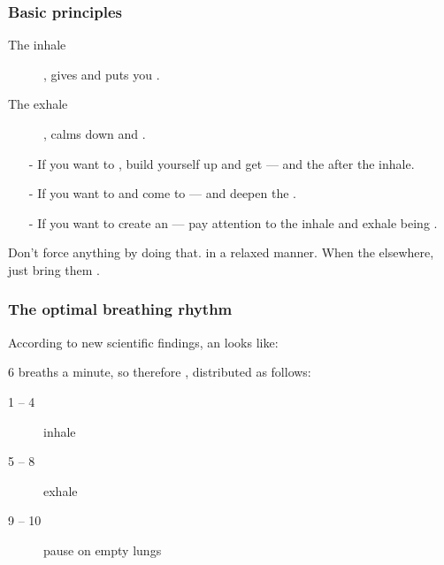 \begin{frame}
\frametitle{Basic principles}

\begin{description}
\item[The inhale] , gives  and puts you .
\item[The exhale] , calms down and .
  \end{description}

\begin{itemize}
\item[-] If you want to , build yourself up and get  ---  and the  after the inhale.
\item[-] If you want to  and come to  ---  and deepen the .
  \item[-] If you want to create an  --- pay attention to the inhale and exhale being .
\end{itemize}

Don't force anything by doing that.  in a relaxed manner. When the  elsewhere, just bring them .
\end{frame}


\begin{frame}
  \frametitle{The optimal breathing rhythm}

  According to new scientific findings, an  looks like:

  6 breaths a minute, so therefore , distributed as follows:

  \begin{description}
  \item[1 -- 4] inhale
  \item[5 -- 8] exhale
    \item[9 -- 10] pause on empty lungs
    \end{description}
\end{frame}

